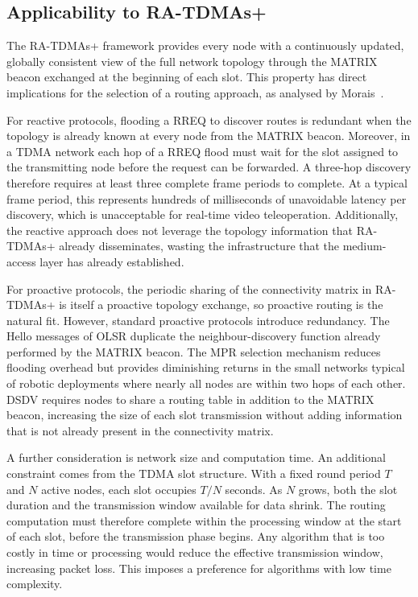 \subsection{Applicability to RA-TDMAs+}
\label{sec:routing-applicability}

The RA-TDMAs+ framework provides every node with a continuously updated, globally
consistent view of the full network topology through the MATRIX beacon exchanged at the
beginning of each slot. This property has direct implications for the selection of a routing
approach, as analysed by Morais~\cite{morais2024synchronization}.

For reactive protocols, flooding a RREQ to discover routes is redundant when the topology is already known at every
node from the MATRIX beacon. Moreover, in a TDMA network each hop of a RREQ flood
must wait for the slot assigned to the transmitting node before the request can be forwarded. A
three-hop discovery therefore requires at least three complete frame periods to complete. At a
typical frame period, this represents hundreds of milliseconds of unavoidable latency per
discovery, which is unacceptable for real-time video teleoperation. Additionally, the reactive
approach does not leverage the topology information that RA-TDMAs+ already disseminates,
wasting the infrastructure that the medium-access layer has already established.

For proactive protocols, the periodic sharing of the connectivity matrix in RA-TDMAs+ is itself a proactive topology
exchange, so proactive routing is the natural fit. However, standard proactive protocols
introduce redundancy. The Hello messages of OLSR duplicate the neighbour-discovery function
already performed by the MATRIX beacon. The MPR selection mechanism reduces flooding
overhead but provides diminishing returns in the small networks typical of robotic deployments
where nearly all nodes are within two hops of each other. DSDV requires nodes to share a
routing table in addition to the MATRIX beacon, increasing the size of each slot transmission
without adding information that is not already present in the connectivity matrix.

A further consideration is network size and computation time. An additional constraint comes from the TDMA slot structure. With a fixed round period $T$
and $N$ active nodes, each slot occupies $T/N$ seconds. As $N$ grows, both the slot duration
and the transmission window available for data shrink. The routing computation must therefore
complete within the processing window at the start of each slot, before the transmission phase
begins. Any algorithm that is too costly in time or processing would reduce the effective
transmission window, increasing packet loss. This imposes a preference for algorithms with
low time complexity.

